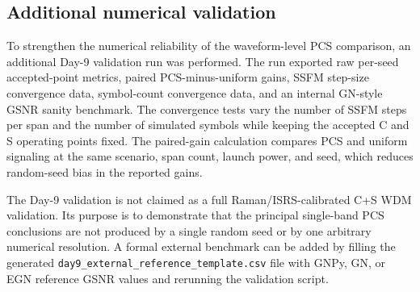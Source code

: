 \subsection{Additional numerical validation}
To strengthen the numerical reliability of the waveform-level PCS comparison, an additional Day-9 validation run was performed. The run exported raw per-seed accepted-point metrics, paired PCS-minus-uniform gains, SSFM step-size convergence data, symbol-count convergence data, and an internal GN-style GSNR sanity benchmark. The convergence tests vary the number of SSFM steps per span and the number of simulated symbols while keeping the accepted C and S operating points fixed. The paired-gain calculation compares PCS and uniform signaling at the same scenario, span count, launch power, and seed, which reduces random-seed bias in the reported gains.

The Day-9 validation is not claimed as a full Raman/ISRS-calibrated C+S WDM validation. Its purpose is to demonstrate that the principal single-band PCS conclusions are not produced by a single random seed or by one arbitrary numerical resolution. A formal external benchmark can be added by filling the generated \texttt{day9\_external\_reference\_template.csv} file with GNPy, GN, or EGN reference GSNR values and rerunning the validation script.
